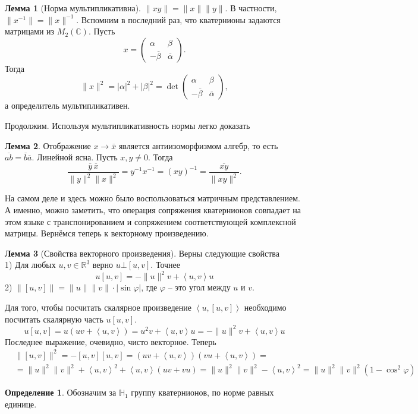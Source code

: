 \documentclass[12pt,a4paper,oneside]{book}
\theoremstyle{definition}
\newtheorem*{defn}{\color{yellow!30!red} Определение}
\newtheorem{lem}{\color{green!50!black}Лемма}
\newcommand{\ovl}{\overline}
\newcommand{\R}{\mathbb R}
\renewcommand{\C}{\mathbb C}
\renewcommand{\H}{\mathbb H}
\def\ffi{\varphi}
\def\lan{\left\langle }
\def\ran{\right\rangle}
\def\dfn{\begin{defn}}
\def\edfn{\end{defn}}
\def\lm{\begin{lem}}
\def\elm{\end{lem}}
\def\pmat{\begin{pmatrix}}
\def\epmat{\end{pmatrix}}
\begin{document}
\lm[Норма мультипликативна] $\|xy\|=\|x\|\|y\|$. В частности, $\|x^{-1}\|=\|x\|^{-1}$.
\proof Вспомним в последний раз, что кватернионы задаются матрицами из $M_2(\C)$. Пусть 
$$x=\pmat \alpha & \beta \\ -\ovl{\beta} & \ovl{\alpha}\epmat.$$
Тогда $$\|x\|^2=|\alpha|^2+|\beta|^2=\det \pmat \alpha & \beta \\ -\ovl{\beta} & \ovl{\alpha}\epmat,$$
а определитель мультипликативен.
\endproof
\elm



Продолжим. Используя мультипликативность нормы легко доказать 
\lm Отображение $x \to \ovl{x}$ является антиизоморфизмом алгебр, то есть $\ovl{ab}=\ovl{b}\ovl{a}$.
\proof Линейной ясна. Пусть $x,y \neq 0$. Тогда $$\frac{\ovl{y}\,\ovl{x}}{\|y\|^2\|x\|^2}=y^{-1}x^{-1}=(xy)^{-1}=\frac{\ovl{xy}}{\|xy\|^2}.$$
\elm

На самом деле и здесь можно было воспользоваться матричным представлением. А именно, можно заметить, что операция сопряжения кватернионов совпадает на этом языке с транспонированием и сопряжением соответствующей комплексной матрицы. Вернёмся теперь к векторному произведению.





\lm[Свойства векторного произведения] Верны следующие свойства\\
1) Для любых $u,v \in \R^3$ верно $u\bot [u,v]$. Точнее $$u[u,v]= -\|u\|^2v+ \lan u,v\ran u$$
2) $\| [u,v]\|= \|u\|\|v\| \cdot |\sin \ffi |$, где $\ffi$ --  это угол между $u$ и $v$.
\elm
\proof Для того, чтобы посчитать скалярное произведение $\lan u, [u,v]\ran$ необходимо посчитать скалярную часть $u[u,v]$. 
$$u[u,v]= u (uv+ \lan u,v \ran)= u^2 v+ \lan u,v \ran u= -\|u\|^2 v+ \lan u,v \ran u$$
Последнее выражение, очевидно, чисто векторное.
Теперь
\begin{align*}
&\|[u,v]\|^2= -[u,v][u,v]= (uv + \lan u,v\ran)(vu + \lan u,v\ran)=\\
&=\|u\|^2\|v\|^2+ \lan u,v\ran^2 + \lan u,v\ran (uv+vu)=\|u\|^2\|v\|^2 - \lan u,v\ran^2= \|u\|^2\|v\|^2(1-\cos^2 \ffi)
\end{align*}
\endproof

\dfn Обозначим за $\H_{1}$ группу кватернионов, по норме равных единице.
\edfn
\end{document}
